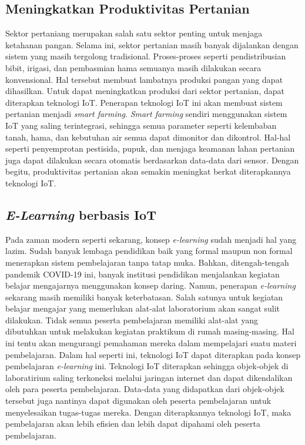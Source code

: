 \documentclass[12pt, letterpaper]{article}
\begin{document}
\subsection{Meningkatkan Produktivitas Pertanian}
Sektor pertaniang merupakan salah satu sektor penting untuk menjaga ketahanan pangan. Selama ini, sektor pertanian masih banyak dijalankan dengan sistem yang masih tergolong tradisional. Proses-proses seperti pendistribusian bibit, irigasi, dan pembasmian hama semuanya masih dilakukan secara konvensional. Hal tersebut membuat lambatnya produksi pangan yang dapat dihasilkan.
\newline
\indent
Untuk dapat meningkatkan produksi dari sektor pertanian, dapat diterapkan teknologi IoT. Penerapan teknologi IoT ini akan membuat sistem pertanian menjadi \textit{smart farming}. \textit{Smart farming} sendiri menggunakan sistem IoT yang saling terintegrasi, sehingga semua parameter seperti kelembaban tanah, hama, dan kebutuhan air semua dapat dimonitor dan dikontrol. Hal-hal seperti penyemprotan pestisida, pupuk, dan menjaga keamanan lahan pertanian juga dapat dilakukan secara otomatis
berdasarkan data-data dari sensor. Dengan begitu, produktivitas pertanian akan semakin meningkat berkat diterapkannya teknologi IoT.\cite{iemcon17} 
\newline
\subsection{\textit{E-Learning} berbasis IoT}
Pada zaman modern seperti sekarang, konsep \textit{e-learning} sudah menjadi hal yang lazim. Sudah banyak lembaga pendidikan baik yang formal maupun non formal menerapkan sistem pembelajaran tanpa tatap muka. Bahkan, ditengah-tengah pandemik COVID-19 ini, banyak institusi pendidikan menjalankan kegiatan belajar mengajarnya menggunakan konsep daring.
\newline
\indent
Namun, penerapan \textit{e-learning} sekarang masih memiliki banyak keterbatasan. Salah satunya untuk kegiatan belajar mengajar yang memerlukan alat-alat laboratorium akan sangat sulit dilakukan. Tidak semua peserta pembelajaran memiliki alat-alat yang dibutuhkan untuk melakukan kegiatan praktikum di rumah masing-masing. Hal ini tentu akan mengurangi pemahaman mereka dalam mempelajari suatu materi pembelajaran.
\newline
\indent
Dalam hal seperti ini, teknologi IoT dapat diterapkan pada konsep pembelajaran \textit{e-learning} ini. Teknologi IoT diterapkan sehingga objek-objek di laboratirium saling terkoneksi melalui jaringan internet dan dapat dikendalikan oleh para peserta pembelajaran. \cite{ijdr17} Data-data yang didapatkan dari objek-objek tersebut juga nantinya dapat digunakan oleh peserta pembelajaran untuk menyelesaikan tugas-tugas mereka. Dengan diterapkannya teknologi IoT, maka pembelajaran akan lebih
efisien dan lebih dapat dipahami oleh peserta pembelajaran.
\end{document}
